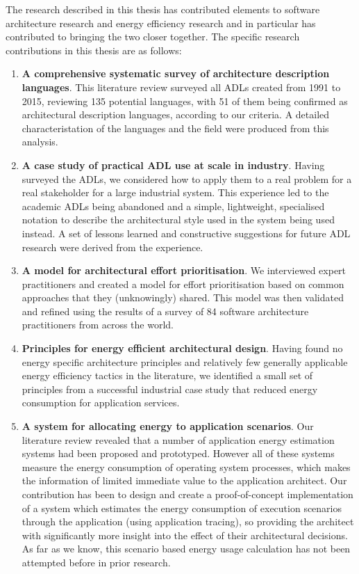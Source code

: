 The research described in this thesis has contributed elements to software architecture research and energy efficiency research and in particular has contributed to bringing the two closer together.
\pagebreak
The specific research contributions in this thesis are as follows: \nopagebreak
\begin{enumerate}
	\item \textbf{A comprehensive systematic survey of architecture description languages}.  This literature review surveyed all ADLs created from 1991 to 2015, reviewing 135 potential languages, with 51 of them being confirmed as architectural description languages, according to our criteria.  A detailed characteristation of the languages and the field were produced from this analysis.
	\item \textbf{A case study of practical ADL use at scale in industry}.  Having surveyed the ADLs, we considered how to apply them to a real problem for a real stakeholder for a large industrial system.  This experience led to the academic ADLs being abandoned and a simple, lightweight, specialised notation to describe the architectural style used in the system being used instead.  A set of lessons learned and constructive suggestions for future ADL research were derived from the experience.
	\item \textbf{A model for architectural effort prioritisation}.  We interviewed expert practitioners and created a model for effort prioritisation based on common approaches that they (unknowingly) shared.  This model was then validated and refined using the results of a survey of 84 software architecture practitioners from across the world.
	\item \textbf{Principles for energy efficient architectural design}.  Having found no energy specific architecture principles and relatively few generally applicable energy efficiency tactics in the literature, we identified a small set of principles from a successful industrial case study that reduced energy consumption for application services.
	\item \textbf{A system for allocating energy to application scenarios}.  Our literature review revealed that a number of application energy estimation systems had been proposed and prototyped.  However all of these systems measure the energy consumption of operating system processes, which makes the information of limited immediate value to the application architect.  Our contribution has been to design and create a proof-of-concept implementation of a system which estimates the energy consumption of execution scenarios through the application (using application tracing), so providing the architect with significantly more insight into the effect of their architectural decisions. As far as we know, this scenario based energy usage calculation has not been attempted before in prior research.
\end{enumerate}


